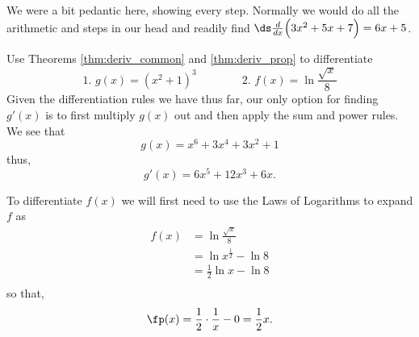 We were a bit pedantic here, showing every step. Normally we would do all the arithmetic and steps in our head and readily find $\ds \frac{d}{dx}\Bigl(3x^2+5x+7\Bigr) = 6x+5$.

\begin{example}\label{ex_der15}
Use Theorems \ref{thm:deriv_common} and \ref{thm:deriv_prop} to differentiate
\[\text{1. }g(x)=(x^2+1)^3\qquad\qquad\text{2. }f(x)=\ln\frac{\sqrt{x}}8\]
\solution
Given the differentiation rules we have thus far, our only option for finding $g'(x)$ is to first multiply $g(x)$ out and then apply the sum and power rules. We see that
\[g(x) = x^6 + 3x^4 + 3x^2 + 1\]
thus,
\[g'(x) = 6x^5 + 12x^3 + 6x.\]

To differentiate $f(x)$ we will first need to use the Laws of Logarithms to expand $f$ as
\begin{align*}
f(x)
&= \ln \frac{\sqrt x}{8}\\
&= \ln x^{\frac{1}{2}} - \ln 8 \\
&= \frac12\ln x - \ln 8 \\
\end{align*}
so that,
\[\fp(x)=\frac12\cdot\frac1x-0=\frac12x.\]
\end{example}

